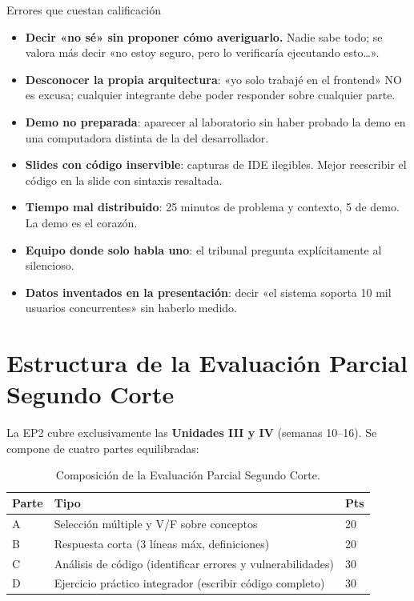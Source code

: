 \begin{cajaadvertencia}{Errores que cuestan calificación}
\begin{itemize}
\item \textbf{Decir «no sé» sin proponer cómo averiguarlo.} Nadie
sabe todo; se valora más decir «no estoy seguro, pero lo verificaría
ejecutando esto\dots».
\item \textbf{Desconocer la propia arquitectura}: «yo solo trabajé en
el frontend» NO es excusa; cualquier integrante debe poder responder
sobre cualquier parte.
\item \textbf{Demo no preparada}: aparecer al laboratorio sin haber
probado la demo en una computadora distinta de la del desarrollador.
\item \textbf{Slides con código inservible}: capturas de IDE
ilegibles. Mejor reescribir el código en la slide con sintaxis
resaltada.
\item \textbf{Tiempo mal distribuido}: 25 minutos de problema y
contexto, 5 de demo. La demo es el corazón.
\item \textbf{Equipo donde solo habla uno}: el tribunal pregunta
explícitamente al silencioso.
\item \textbf{Datos inventados en la presentación}: decir «el sistema
soporta 10 mil usuarios concurrentes» sin haberlo medido.
\end{itemize}
\end{cajaadvertencia}

\section{Estructura de la Evaluación Parcial Segundo Corte}

La EP2 cubre exclusivamente las \textbf{Unidades III y IV} (semanas
10--16). Se compone de cuatro partes equilibradas:

\begin{table}[htbp]
\centering
\caption{Composición de la Evaluación Parcial Segundo Corte.}
\footnotesize
\begin{tabularx}{\textwidth}{lXl}
\toprule
\textbf{Parte} & \textbf{Tipo} & \textbf{Pts}\\
\midrule
A & Selección múltiple y V/F sobre conceptos & 20 \\
B & Respuesta corta (3 líneas máx, definiciones) & 20 \\
C & Análisis de código (identificar errores y vulnerabilidades) & 30 \\
D & Ejercicio práctico integrador (escribir código completo) & 30 \\
\bottomrule
\end{tabularx}
\end{table}

